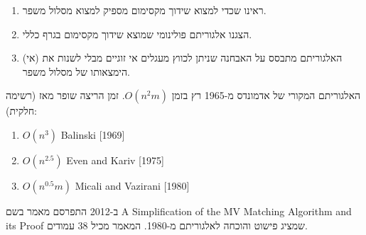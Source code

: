 \begin{enumerate}
\item
ראינו שכדי למצוא שידוך מקסימום מספיק למצוא מסלול משפר.
\item
הצגנו אלגוריתם פולינומי שמוצא שידוך מקסימום בגרף כללי. 
\item
האלגוריתם מתבסס על האבחנה שניתן לכווץ מעגלים אי זוגיים מבלי לשנות את 
(אי) הימצאותו של מסלול משפר.
\end{enumerate}

האלגוריתם המקורי של אדמונדס מ-1965 רץ בזמן 
$O(n^2m)$.
זמן הריצה שופר מאז (רשימה חלקית):
\begin{enumerate}
\item $O(n^3)$ Balinski [1969]
\item $O(n^{2.5})$ Even and Kariv [1975]
\item $O(n^{0.5} m)$ Micali and Vazirani [1980]
\end{enumerate}

ב-2012 התפרסם מאמר בשם 
\textenglish{A Simplification of the MV Matching Algorithm and its Proof}
שמציג פישוט והוכחה לאלגוריתם מ-1980. המאמר מכיל 38 עמודים.
